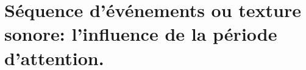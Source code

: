 \chapter{Séquence d'événements ou texture sonore: l'influence de la période d'attention.}
\label{app:xp_texture}

